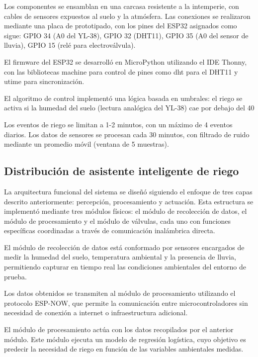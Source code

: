 \documentclass[pdflatex,sn-mathphys-num]{sn-jnl}%
\theoremstyle{thmstyleone}%
\theoremstyle{thmstyletwo}%
\theoremstyle{thmstylethree}%
\begin{document}
\begin{multicols}{2}
Los componentes se ensamblan en una carcasa resistente a la intemperie, con cables de sensores expuestos al suelo y la atmósfera. Las conexiones se realizaron mediante una placa de prototipado, con los pines del ESP32 asignados como sigue: GPIO 34 (A0 del YL-38), GPIO 32 (DHT11), GPIO 35 (A0 del sensor de lluvia), GPIO 15 (relé para electroválvula).

El firmware del ESP32 se desarrolló en MicroPython utilizando el IDE Thonny, con las bibliotecas machine para control de pines como dht para el DHT11 y utime para sincronización. 

El algoritmo de control implementó una lógica basada en umbrales: el riego se activa si la humedad del suelo (lectura analógica del YL-38) cae por debajo del 40%

Los eventos de riego se limitan a 1-2 minutos, con un máximo de 4 eventos diarios. Los datos de sensores se procesan cada 30 minutos, con filtrado de ruido mediante un promedio móvil (ventana de 5 muestras).

\subsection*{Distribución de asistente inteligente de riego}
La arquitectura funcional del sistema se diseñó siguiendo el enfoque de tres capas descrito anteriormente: percepción, procesamiento y actuación. Esta estructura se implementó mediante tres módulos físicos: el módulo de recolección de datos, el módulo de procesamiento y el módulo de válvulas, cada uno con funciones específicas coordinadas a través de comunicación inalámbrica directa.

El módulo de recolección de datos está conformado por sensores encargados de medir la humedad del suelo, temperatura ambiental y la presencia de lluvia, permitiendo capturar en tiempo real las condiciones ambientales del entorno de prueba.

Los datos obtenidos se transmiten al módulo de procesamiento utilizando el protocolo ESP-NOW, que permite la comunicación entre microcontroladores sin necesidad de conexión a internet o infraestructura adicional.

El módulo de procesamiento actúa con los datos recopilados por el anterior módulo. Este módulo ejecuta un modelo de regresión logística, cuyo objetivo es predecir la necesidad de riego en función de las variables ambientales medidas. 


\end{multicols}
\end{document}

